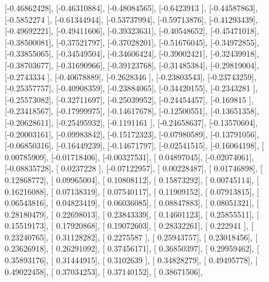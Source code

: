 \documentclass{article}
\begin{document}
       [-0.46862428],
       [-0.46310884],
       [-0.48084565],
       [-0.6423913 ],
       [-0.44587863],
       [-0.5852274 ],
       [-0.61344944],
       [-0.53737994],
       [-0.59713876],
       [-0.41293439],
       [-0.49692221],
       [-0.49411606],
       [-0.39323631],
       [-0.40548652],
       [-0.45471018],
       [-0.38500081],
       [-0.37521797],
       [-0.37028201],
       [-0.51676045],
       [-0.34972855],
       [-0.33855065],
       [-0.34549504],
       [-0.34606424],
       [-0.39002421],
       [-0.32439918],
       [-0.38703677],
       [-0.31690966],
       [-0.39123768],
       [-0.31485384],
       [-0.29819004],
       [-0.2743334 ],
       [-0.40678889],
       [-0.2628346 ],
       [-0.23803543],
       [-0.23743259],
       [-0.25357757],
       [-0.40908359],
       [-0.23884065],
       [-0.34420155],
       [-0.2343281 ],
       [-0.25573082],
       [-0.32711697],
       [-0.25039952],
       [-0.24454457],
       [-0.169815  ],
       [-0.23418567],
       [-0.17999975],
       [-0.14617678],
       [-0.12500551],
       [-0.13651358],
       [-0.20628611],
       [-0.25495932],
       [-0.1191161 ],
       [-0.24658637],
       [-0.13570604],
       [-0.20003161],
       [-0.09983842],
       [-0.15172323],
       [-0.07980589],
       [-0.13791056],
       [-0.06850316],
       [-0.16449239],
       [-0.14671797],
       [-0.02541515],
       [-0.16064198],
       [ 0.00785909],
       [-0.01718406],
       [-0.00327531],
       [ 0.04897045],
       [-0.02074061],
       [-0.08835728],
       [ 0.0237228 ],
       [-0.07122957],
       [ 0.00228487],
       [ 0.01746898],
       [ 0.12868772],
       [ 0.09965004],
       [ 0.10808112],
       [ 0.15873292],
       [ 0.00745114],
       [ 0.16216088],
       [ 0.07138319],
       [ 0.07540117],
       [ 0.11909152],
       [ 0.07913815],
       [ 0.06543816],
       [ 0.04823419],
       [ 0.06036085],
       [ 0.08847883],
       [ 0.08051321],
       [ 0.28180479],
       [ 0.22698013],
       [ 0.23843339],
       [ 0.14601123],
       [ 0.25855511],
       [ 0.15519173],
       [ 0.17920868],
       [ 0.19072603],
       [ 0.28332261],
       [ 0.222941  ],
       [ 0.23240765],
       [ 0.31128282],
       [ 0.2275587 ],
       [ 0.25943757],
       [ 0.23018456],
       [ 0.23626918],
       [ 0.26291092],
       [ 0.37456171],
       [ 0.36850397],
       [ 0.29959462],
       [ 0.35893176],
       [ 0.31444915],
       [ 0.3102639 ],
       [ 0.34828279],
       [ 0.49495778],
       [ 0.49022458],
       [ 0.37034253],
       [ 0.37140152],
       [ 0.38671506],
\end{document}
